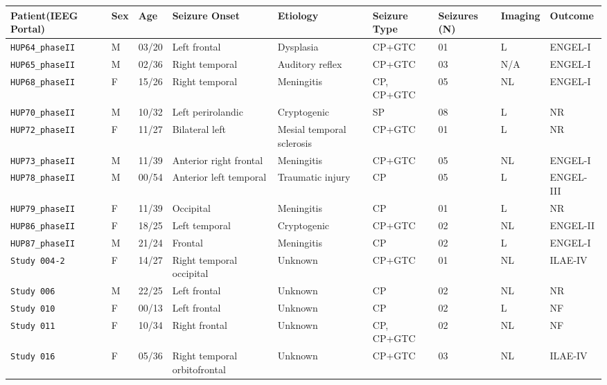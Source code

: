 \begin{table}[H]
    \scriptsize
    \centering
    \begin{tabular}{|x{2cm}|x{0.5cm}|x{0.75cm}|x{2cm}|x{1.5cm}|x{1.25cm}|x{1cm}|x{1cm}|x{1.40cm}|}
        \hline
        Patient\newline (IEEG Portal) & Sex & Age & Seizure Onset & Etiology & Seizure Type & Seizures (N) & Imaging & Outcome \\ \hline \hline
        \verb|HUP64_phaseII| & M & 03/20 & Left frontal & Dysplasia & CP+GTC & 01 & L & ENGEL-I\\ \hline
        \verb|HUP65_phaseII| & M & 02/36 & Right temporal & Auditory reflex & CP+GTC & 03 & N/A & ENGEL-I\\ \hline
        \verb|HUP68_phaseII| & F & 15/26 & Right temporal & Meningitis & CP, CP+GTC & 05 & NL & ENGEL-I\\ \hline
        \verb|HUP70_phaseII| & M & 10/32 & Left perirolandic & Cryptogenic & SP & 08 & L & NR\\ \hline
        \verb|HUP72_phaseII| & F & 11/27 & Bilateral left & Mesial temporal sclerosis & CP+GTC & 01 & L & NR\\ \hline
        \verb|HUP73_phaseII| & M & 11/39 & Anterior right frontal & Meningitis & CP+GTC & 05 & NL & ENGEL-I\\ \hline
        \verb|HUP78_phaseII| & M & 00/54 & Anterior left temporal & Traumatic injury & CP & 05 & L & ENGEL-III\\ \hline
        \verb|HUP79_phaseII| & F & 11/39 & Occipital & Meningitis & CP & 01 & L & NR\\ \hline
        \verb|HUP86_phaseII| & F & 18/25 & Left temporal & Cryptogenic & CP+GTC & 02 & NL & ENGEL-II\\ \hline
        \verb|HUP87_phaseII| & M & 21/24 & Frontal & Meningitis & CP & 02 & L & ENGEL-I\\ \hline
        \verb|Study 004-2|   & F & 14/27 & Right temporal occipital & Unknown & CP+GTC & 01 & NL & ILAE-IV\\ \hline
        \verb|Study 006|     & M & 22/25 & Left frontal & Unknown & CP & 02 & NL & NR\\ \hline
        \verb|Study 010|     & F & 00/13 & Left frontal & Unknown & CP & 02 & L & NF\\ \hline
        \verb|Study 011|     & F & 10/34 & Right frontal & Unknown & CP, CP+GTC & 02 & NL & NF\\ \hline
        \verb|Study 016|     & F & 05/36 & Right temporal orbitofrontal & Unknown & CP+GTC & 03 & NL & ILAE-IV\\ \hline

\end{tabular}
\end{table}
